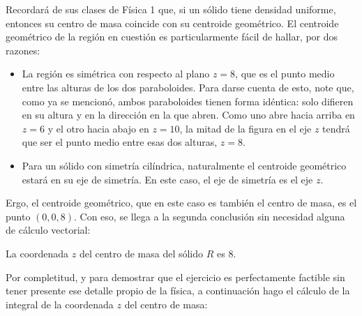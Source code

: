 \documentclass{fmbvecto}
\begin{document}
\begin{problema}
\vspace*{1em}
Recordará de sus clases de Física 1 que, si un sólido tiene densidad uniforme, entonces su centro de masa coincide con su centroide geométrico. El centroide geométrico de la región en cuestión es particularmente fácil de hallar, por dos razones:
\begin{itemize}
    \item La región es simétrica con respecto al plano \(z = 8\), que es el punto medio entre las alturas de los dos paraboloides. Para darse cuenta de esto, note que, como ya se mencionó, ambos paraboloides tienen forma idéntica: solo difieren en su altura y en la dirección en la que abren. Como uno abre hacia arriba en \(z = 6\) y el otro hacia abajo en \(z = 10\), la mitad de la figura en el eje \(z\) tendrá que ser el punto medio entre esas dos alturas, \(z = 8\).
    \item Para un sólido con simetría cilíndrica, naturalmente el centroide geométrico estará en su eje de simetría. En este caso, el eje de simetría es el eje \(z\).
\end{itemize}
Ergo, el centroide geométrico, que en este caso es también el centro de masa, es el punto \((0, 0, 8)\). Con eso, se llega a la segunda conclusión sin necesidad alguna de cálculo vectorial:
\begin{gbox}
    La coordenada \(z\) del centro de masa del sólido \(R\) es \(8\).
\end{gbox}

Por completitud, y para demostrar que el ejercicio es perfectamente factible sin tener presente ese detalle propio de la física, a continuación hago el cálculo de la integral de la coordenada \(z\) del centro de masa:


\end{problema}
\end{document}
